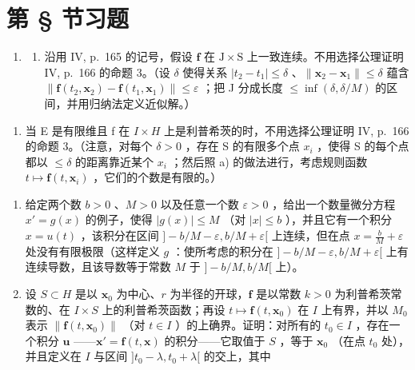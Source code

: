 \section*{第 \S{} 节习题}
{}

\begin{enumerate}
\def\labelenumi{\arabic{enumi})}
\tightlist
\item
  \begin{enumerate}
  \def\labelenumii{\alph{enumii})}
  \tightlist
  \item
    沿用 IV, p.~165 的记号，假设 \(\mathbf{f}\) 在 \(\mathrm{J} \times \mathrm{S}\) 上一致连续。不用选择公理证明 IV, p.~166 的命题 3。（设 \(\delta\) 使得关系 \(|t_2 - t_1| \leqslant \delta\) 、\(\| \mathbf{x}_2 - \mathbf{x}_1 \| \leqslant \delta\) 蕴含 \(\| \mathbf{f}(t_2, \mathbf{x}_2) - \mathbf{f}(t_1, \mathbf{x}_1) \| \leqslant \varepsilon\) ；把 J 分成长度 \(\leqslant \inf(\delta, \delta / M)\) 的区间，并用归纳法定义近似解。）
  \end{enumerate}
\end{enumerate}

\begin{enumerate}
\def\labelenumi{\alph{enumi})}
\setcounter{enumi}{1}
\tightlist
\item
  当 E 是有限维且 f 在 \(I \times H\) 上是利普希茨的时，不用选择公理证明 IV, p.~166 的命题 3。（注意，对每个 \(\delta > 0\) ，存在 S 的有限多个点 \(x_{i}\) ，使得 S 的每个点都以 \(\leqslant \delta\) 的距离靠近某个 \(x_{i}\) ；然后照 a) 的做法进行，考虑规则函数 \(t \mapsto \mathbf{f}(t, \mathbf{x}_{i})\) ，它们的个数是有限的。）
\end{enumerate}

\begin{enumerate}
\def\labelenumi{\arabic{enumi})}
\setcounter{enumi}{1}
\item
  给定两个数 \(b > 0\) 、\(M > 0\) 以及任意一个数 \(\varepsilon > 0\) ，给出一个数量微分方程 \(x' = g(x)\) 的例子，使得 \(|g(x)| \leqslant M\) （对 \(|x| \leqslant b\) ），并且它有一个积分 \(x = u(t)\) ，该积分在区间 \(] - b/M - \varepsilon, b/M + \varepsilon[\) 上连续，但在点 \(x = \frac{b}{M} + \varepsilon\) 处没有有限极限（这样定义 \(g\) ：使所考虑的积分在 \(] - b/M - \varepsilon, b/M + \varepsilon[\) 上有连续导数，且该导数等于常数 \(M\) 于 \(] - b/M, b/M[\) 上）。
\item
  设 \(S \subset H\) 是以 \(\mathbf{x}_0\) 为中心、\(r\) 为半径的开球，\(\mathbf{f}\) 是以常数 \(k > 0\) 为利普希茨常数的、在 \(I \times S\) 上的利普希茨函数；再设 \(t \mapsto \mathbf{f}(t, \mathbf{x}_0)\) 在 \(I\) 上有界，并以 \(M_0\) 表示 \(\| \mathbf{f}(t, \mathbf{x}_0) \|\) （对 \(t \in I\) ）的上确界。证明：对所有的 \(t_0 \in I\) ，存在一个积分 \(\mathbf{u}\) ——\(\mathbf{x}' = \mathbf{f}(t, \mathbf{x})\) 的积分——它取值于 \(S\) ，等于 \(\mathbf{x}_0\) （在点 \(t_0\) 处），并且定义在 \(I\) 与区间 \(]t_0 - \lambda, t_0 + \lambda[\) 的交上，其中
\end{enumerate}

